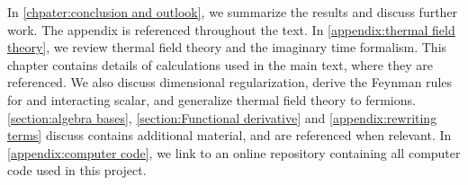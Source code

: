 In \autoref{chpater:conclusion and outlook}, we summarize the results and discuss further work.
The appendix is referenced throughout the text.
In \autoref{appendix:thermal field theory}, we review thermal field theory and the imaginary time formalism.
This chapter contains details of calculations used in the main text, where they are referenced.
We also discuss dimensional regularization, derive the Feynman rules for and interacting scalar, and generalize thermal field theory to fermions.
\autoref{section:algebra bases}, \autoref{section:Functional derivative} and \autoref{appendix:rewriting terms} discuss contains additional material, and are referenced when relevant.
In \autoref{appendix:computer code}, we link to an online repository containing all computer code used in this project.
